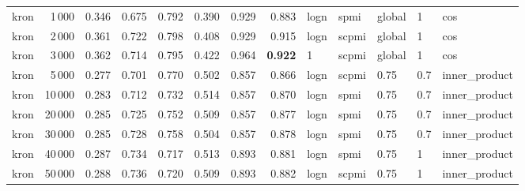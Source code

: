 \begin{tabular}{lrrrrrrrlllll}
    kron &            1\,000 &      0.346 &  0.675 &  0.792 &  0.390 &      0.929 &      0.883 &  logn &   spmi &  global &    1 &            cos \\
    kron &            2\,000 &      0.361 &  0.722 &  0.798 &  0.408 &      0.929 &      0.915 &  logn &  scpmi &  global &    1 &            cos \\
    kron &            3\,000 &      0.362 &  0.714 &  0.795 &  0.422 &      0.964 &      \textbf{0.922} &     1 &  scpmi &  global &    1 &            cos \\
    kron &            5\,000 &      0.277 &  0.701 &  0.770 &  0.502 &      0.857 &      0.866 &  logn &  scpmi &    0.75 &  0.7 &  inner\_product \\
    kron &           10\,000 &      0.283 &  0.712 &  0.732 &  0.514 &      0.857 &      0.870 &  logn &   spmi &    0.75 &  0.7 &  inner\_product \\
    kron &           20\,000 &      0.285 &  0.725 &  0.752 &  0.509 &      0.857 &      0.877 &  logn &   spmi &    0.75 &  0.7 &  inner\_product \\
    kron &           30\,000 &      0.285 &  0.728 &  0.758 &  0.504 &      0.857 &      0.878 &  logn &   spmi &    0.75 &  0.7 &  inner\_product \\
    kron &           40\,000 &      0.287 &  0.734 &  0.717 &  0.513 &      0.893 &      0.881 &  logn &   spmi &    0.75 &    1 &  inner\_product \\
    kron &           50\,000 &      0.288 &  0.736 &  0.720 &  0.509 &      0.893 &      0.882 &  logn &  scpmi &    0.75 &    1 &  inner\_product \\
\bottomrule
\end{tabular}
